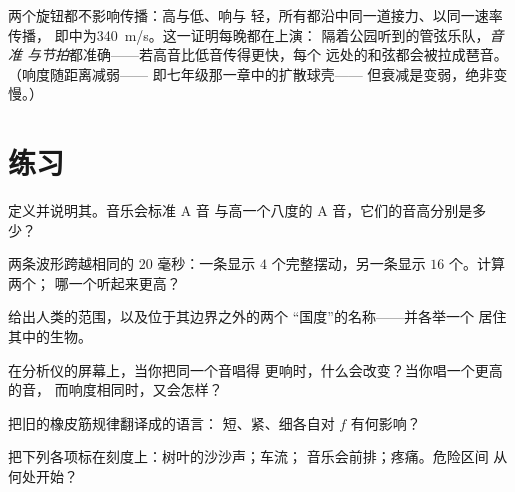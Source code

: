 \begin{example}[速度不受任何旋钮影响]\label{ex:g8:sound-pitch-loudness:speed}
两个旋钮都不影响传播：高与低、响与
轻，所有都沿中同一道接力、以同一速率传播，
即中为\qty{340}{m/s}。这一证明每晚都在上演：
隔着公园听到的管弦乐队，\emph{音准
与节拍}都准确——若高音比低音传得更快，每个
远处的和弦都会被拉成琶音。（响度随距离减弱——
即七年级那一章中的扩散球壳——
但衰减是变弱，绝非变慢。）
\end{example}

\section{练习}

\begin{exercise}[$\star$]\label{exo:g8:sound-pitch-loudness:1}
定义并说明其。音乐会标准 A 音
与高一个八度的 A 音，它们的音高分别是多少？
\end{exercise}

\begin{exercise}[$\star$]\label{exo:g8:sound-pitch-loudness:2}
两条波形跨越相同的 $20$ 毫秒：一条显示 $4$
个完整摆动，另一条显示 $16$ 个。计算两个；
哪一个听起来更高？
\end{exercise}

\begin{exercise}[$\star$]\label{exo:g8:sound-pitch-loudness:3}
给出人类的范围，以及位于其边界之外的两个
“国度”的名称——并各举一个
居住其中的生物。
\end{exercise}

\begin{exercise}[$\star$]\label{exo:g8:sound-pitch-loudness:4}
在分析仪的屏幕上，当你把同一个音唱得
更响时，什么会改变？当你唱一个更高的音，
而响度相同时，又会怎样？
\end{exercise}

\begin{exercise}[$\star$]\label{exo:g8:sound-pitch-loudness:5}
把旧的橡皮筋规律翻译成的语言：
短、紧、细各自对 $f$ 有何影响？
\end{exercise}

\begin{exercise}[$\star$]\label{exo:g8:sound-pitch-loudness:6}
把下列各项标在刻度上：树叶的沙沙声；车流；
音乐会前排；疼痛。危险区间
从何处开始？
\end{exercise}


